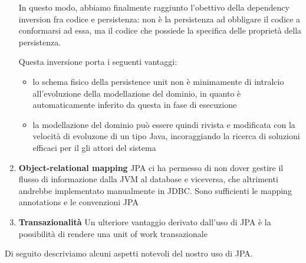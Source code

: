 \begin{enumerate}
          In questo modo, abbiamo finalmente raggiunto l'obettivo della dependency inversion
          fra codice e persistenza: non è la persistenza ad obbligare il codice a conformarsi
          ad essa, ma il codice che possiede la specifica delle proprietà della persistenza.

          Questa inversione porta i seguenti vantaggi:
          \begin{itemize}
              \item lo schema fisico della persistence unit non è minimamente di intralcio 
                    all'evoluzione della modellazione del dominio, in quanto è automaticamente 
                    inferito da questa in fase di esecuzione
              \item la modellazione del dominio può essere quindi rivista e modificata con la
                    velocità di evoluzone di un tipo Java, incoraggiando la ricerca di
                    soluzioni efficaci per il gli attori del sistema
          \end{itemize}

    \item \textbf{Object-relational mapping} \newline
          JPA ci ha permesso di non dover gestire il flusso di informazione dalla JVM al database e viceversa,
          che altrimenti andrebbe implementato manualmente in JDBC. Sono sufficienti le mapping annotations
          e le convenzioni JPA
    \item \textbf{Transazionalità} \newline
          Un ulteriore vantaggio derivato dall'uso di JPA è la possibilità di rendere una unit of work
          transazionale
\end{enumerate}

Di seguito descriviamo alcuni aspetti notevoli del nostro uso di JPA.

